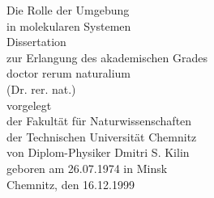 \documentclass[12pt,twoside,a4paper]{report}
\begin{document}
%
%
\thispagestyle{empty}
\begin{center}
{\huge Die Rolle der Umgebung\\[1ex]
in molekularen Systemen}\\
\vspace{3cm}
{\large 
Dissertation\\ zur Erlangung des akademischen Grades\\
doctor rerum naturalium \\ (Dr. rer. nat.)\\[2ex]
vorgelegt\\[2ex]
der Fakult\"at f\"ur Naturwissenschaften\\
der Technischen Universit\"at Chemnitz\\[2ex]
von Diplom-Physiker Dmitri S. Kilin\\[2ex]
geboren am 26.07.1974 in Minsk}\\
\vfill
Chemnitz, den 16.12.1999
\end{center}
\end{document}
